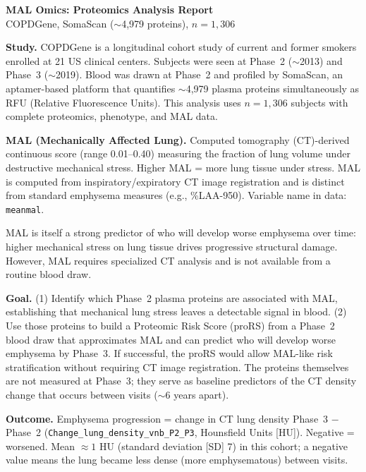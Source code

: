 \documentclass[11pt, letterpaper]{article}
\begin{document}
\begin{center}
  {\Large \textbf{MAL Omics: Proteomics Analysis Report}} \\[4pt]
  {\normalsize COPDGene, SomaScan ($\sim$4,979 proteins), $n = 1{,}306$}
\end{center}

\vspace{6pt}
\noindent\textbf{Study.}
COPDGene is a longitudinal cohort study of current and former smokers
enrolled at 21 US clinical centers. Subjects were seen at Phase~2
($\sim$2013) and Phase~3 ($\sim$2019). Blood was drawn at Phase~2 and
profiled by SomaScan, an aptamer-based platform that quantifies
$\sim$4,979 plasma proteins simultaneously as RFU (Relative Fluorescence
Units). This analysis uses $n = 1{,}306$ subjects with complete
proteomics, phenotype, and MAL data.

\noindent\textbf{MAL (Mechanically Affected Lung).}
Computed tomography (CT)-derived continuous score (range 0.01--0.40)
measuring the fraction of lung volume under destructive mechanical
stress. Higher MAL = more lung tissue under stress. MAL is computed from
inspiratory/expiratory CT image registration and is distinct from
standard emphysema measures (e.g., \%LAA-950). Variable name in data:
\texttt{meanmal}.

MAL is itself a strong predictor of who will develop worse emphysema
over time: higher mechanical stress on lung tissue drives progressive
structural damage. However, MAL requires specialized CT analysis and is
not available from a routine blood draw.

\noindent\textbf{Goal.}
(1) Identify which Phase~2 plasma proteins are associated with MAL,
establishing that mechanical lung stress leaves a detectable signal
in blood.
(2) Use those proteins to build a Proteomic Risk Score (proRS) from a
Phase~2 blood draw that approximates MAL and can predict who will
develop worse emphysema by Phase~3. If successful, the proRS would
allow MAL-like risk stratification without requiring CT image
registration. The proteins themselves are not measured at Phase~3;
they serve as baseline predictors of the CT density change that
occurs between visits ($\sim$6 years apart).

\noindent\textbf{Outcome.}
Emphysema progression = change in CT lung density Phase~3 $-$ Phase~2
(\texttt{Change\_lung\_\allowbreak density\_\allowbreak vnb\_\allowbreak P2\_\allowbreak P3},
Hounsfield Units [HU]). Negative = worsened. Mean $\approx 1$ HU
(standard deviation [SD] 7) in this cohort; a negative value means the
lung became less dense (more emphysematous) between visits.
\end{document}
